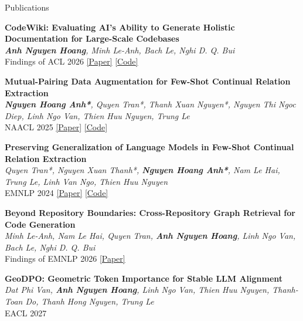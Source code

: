 \documentclass{resume}
\begin{document}
\begin{rSection}{Publications}

\begin{enumerate}[leftmargin=1.8em,label={[\arabic*]},itemsep=0em,topsep=0.1em]
    \item
    \textbf{CodeWiki: Evaluating AI's Ability to Generate Holistic Documentation
    for Large-Scale Codebases}\\
    \textit{\textbf{Anh Nguyen Hoang}, Minh Le-Anh, Bach Le, Nghi D. Q. Bui}\\
    Findings of ACL 2026
    \href{https://aclanthology.org/2026.findings-acl.288/}{[Paper]}
    \href{https://github.com/FSoft-AI4Code/CodeWiki}{[Code]}

    \item
    \textbf{Mutual-Pairing Data Augmentation for Few-Shot Continual Relation Extraction}\\
    \textit{\textbf{Nguyen Hoang Anh*}, Quyen Tran*, Thanh Xuan Nguyen*,
    Nguyen Thi Ngoc Diep, Linh Ngo Van, Thien Huu Nguyen, Trung Le}\\
    NAACL 2025
    \href{https://aclanthology.org/2025.naacl-long.205/}{[Paper]}
    \href{https://github.com/anhnh2002/mutual-pairing-data-augmentation}{[Code]}

    \item
    \textbf{Preserving Generalization of Language Models in Few-Shot Continual
    Relation Extraction}\\
    \textit{Quyen Tran*, Nguyen Xuan Thanh*, \textbf{Nguyen Hoang Anh*},
    Nam Le Hai, Trung Le, Linh Van Ngo, Thien Huu Nguyen}\\
    EMNLP 2024
    \href{https://aclanthology.org/2024.emnlp-main.763/}{[Paper]}
    \href{https://github.com/thanhnx12/CRE-via-MMI}{[Code]}

    \item
    \textbf{Beyond Repository Boundaries: Cross-Repository Graph Retrieval
    for Code Generation}\\
    \textit{Minh Le-Anh, Nam Le Hai, Quyen Tran, \textbf{Anh Nguyen Hoang},
    Linh Ngo Van, Bach Le, Nghi D. Q. Bui}\\
    Findings of EMNLP 2026
    \href{https://arxiv.org/abs/2609.09987}{[Paper]}

    \item
    \textbf{GeoDPO: Geometric Token Importance for Stable LLM Alignment}\\
    \textit{Dat Phi Van, \textbf{Anh Nguyen Hoang}, Linh Ngo Van, Thien Huu Nguyen,
    Thanh-Toan Do, Thanh Hong Nguyen, Trung Le}\\
    EACL 2027


\end{enumerate}
\end{rSection}
\end{document}
